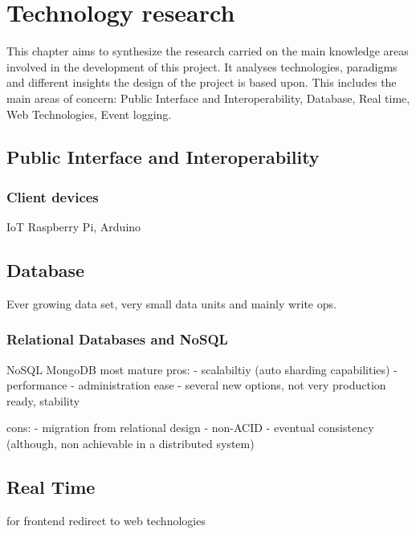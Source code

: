 \chapter{Technology research}

This chapter aims to synthesize the research carried on the main knowledge areas involved in the development of this project. It analyses technologies, paradigms and different insights the design of the project is based upon. This includes the main areas of concern: Public Interface and Interoperability, Database, Real time, Web Technologies, Event logging.   

\section{Public Interface and Interoperability}

\subsection{Client devices}

IoT
Raspberry Pi, Arduino

\section{Database}

Ever growing data set, very small data units and mainly write ops.

\subsection{Relational Databases and NoSQL}

NoSQL
MongoDB most mature
pros:
- scalabiltiy (auto sharding capabilities)
- performance
- administration ease
- several new options, not very production ready, stability

cons: 
- migration from relational design 
- non-ACID
- eventual consistency (although, non achievable in a distributed system)

\section{Real Time}
for frontend redirect to web technologies

